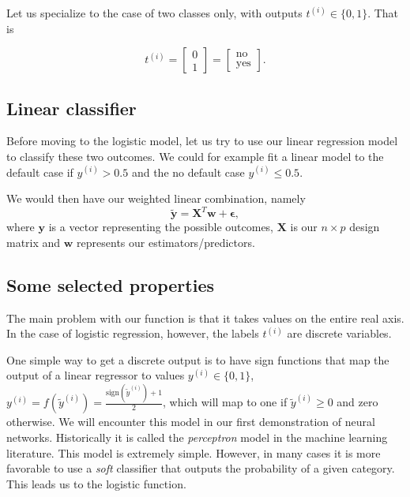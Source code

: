 \documentclass[%
oneside,                 %
final,                   %
10pt]{article}
\begin{document}
Let us specialize to the case of two classes only, with outputs
$t^{(i)} \in \{0,1\}$. That is


\[
t^{(i)} = \begin{bmatrix} 0 \\  1 \end{bmatrix}
= \begin{bmatrix} \mathrm{no}\\  \mathrm{yes} \end{bmatrix}.
\]



\subsection{Linear classifier}

Before moving to the logistic model, let us try to use our linear
regression model to classify these two outcomes. We could for example
fit a linear model to the default case if $y^{(i)} > 0.5$ and the no
default case $y^{(i)} \leq 0.5$.

We would then have our 
weighted linear combination, namely 
\begin{equation}
\boldsymbol{\tilde{y}} = \boldsymbol{X}^T\boldsymbol{w} +  \boldsymbol{\epsilon},
\end{equation}
where $\boldsymbol{y}$ is a vector representing the possible outcomes, $\boldsymbol{X}$ is our
$n\times p$ design matrix and $\boldsymbol{w}$ represents our estimators/predictors.

\subsection{Some selected properties}

The main problem with our function is that it takes values on the
entire real axis. In the case of logistic regression, however, the
labels $t^{(i)}$ are discrete variables. 

One simple way to get a discrete output is to have sign
functions that map the output of a linear regressor to values $y^{(i)} \in \{ 0, 1 \}$,
$y^{(i)} = f(\tilde{y}^{(i)})=\frac{\mathrm{sign}(\tilde{y}^{(i)})+1}{2}$, which will map to one if $\tilde{y}^{(i)}\ge 0$ and zero otherwise. 
We will encounter this model in our first demonstration of neural networks. Historically it is called the \emph{perceptron} model in the machine learning
literature. This model is extremely simple. However, in many cases it is more
favorable to use a \emph{soft} classifier that outputs
the probability of a given category. This leads us to the logistic function.
\end{document}
